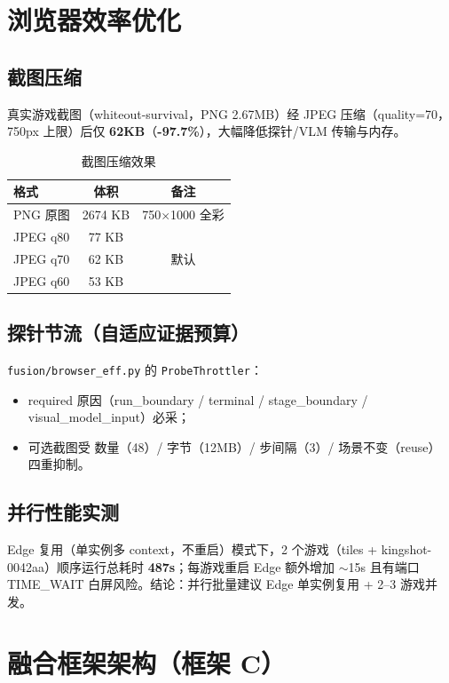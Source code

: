 \documentclass[11pt,a4paper]{article}
\begin{document}
\section{浏览器效率优化}

\subsection{截图压缩}
真实游戏截图（whiteout-survival，PNG 2.67MB）经 JPEG 压缩（quality=70，
750px 上限）后仅 \textbf{62KB}（\textbf{-97.7\%}），大幅降低探针/VLM 传输与内存。

\begin{table}[h!]
\centering
\caption{截图压缩效果}
\begin{tabular}{lcc}
\toprule
格式 & 体积 & 备注 \\
\midrule
PNG 原图 & 2674 KB & 750$\times$1000 全彩 \\
JPEG q80 & 77 KB & \\
JPEG q70 & 62 KB & 默认 \\
JPEG q60 & 53 KB & \\
\bottomrule
\end{tabular}
\end{table}

\subsection{探针节流（自适应证据预算）}
\texttt{fusion/browser\_eff.py} 的 \texttt{ProbeThrottler}：
\begin{itemize}[leftmargin=1.5em]
  \item required 原因（run\_boundary / terminal / stage\_boundary /
        visual\_model\_input）必采；
  \item 可选截图受 数量（48）/ 字节（12MB）/ 步间隔（3）/ 场景不变（reuse）
        四重抑制。
\end{itemize}

\subsection{并行性能实测}
Edge 复用（单实例多 context，不重启）模式下，2 个游戏（tiles +
kingshot-0042aa）顺序运行总耗时 \textbf{487s}；每游戏重启 Edge 额外增加
$\sim$15s 且有端口 TIME\_WAIT 白屏风险。结论：并行批量建议 Edge 单实例复用 +
2--3 游戏并发。

\section{融合框架架构（框架 C）}
\end{document}
